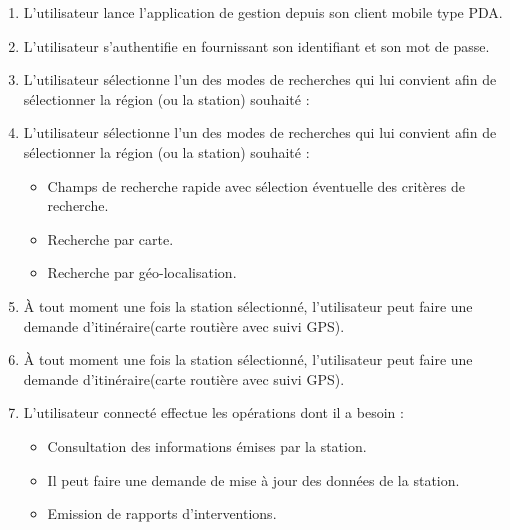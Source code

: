 \begin{enumerate}
\item L'utilisateur lance l'application de gestion depuis son client mobile type PDA.\\
\item L'utilisateur s'authentifie en fournissant son identifiant et son mot de passe.\\

\item L'utilisateur sélectionne l'un des modes de recherches qui lui convient afin de sélectionner
 la région (ou la station) souhaité :\\

\item L'utilisateur sélectionne l'un des modes de recherches qui lui convient afin de sélectionner la région (ou la station) souhaité :\\

	\begin{itemize}
	\item Champs de recherche rapide avec sélection éventuelle des critères de recherche.\\

	\item Recherche par carte.\\

	\item Recherche par géo-localisation.\\
	
	\end{itemize}


	\item À tout moment une fois la station sélectionné, l'utilisateur peut faire une demande 
	d'itinéraire(carte routière avec suivi GPS).\\

	\item À tout moment une fois la station sélectionné, l'utilisateur peut faire une demande d'itinéraire(carte routière avec suivi GPS).\\


	\item L'utilisateur connecté effectue les opérations dont il a besoin :\\
	
	\begin{itemize}
	\item Consultation des informations émises par la station. \\
	\item Il peut faire une demande de mise à jour des données de la station.\\
	\item Emission de rapports d'interventions.\\


\end{itemize}
\end{enumerate}
